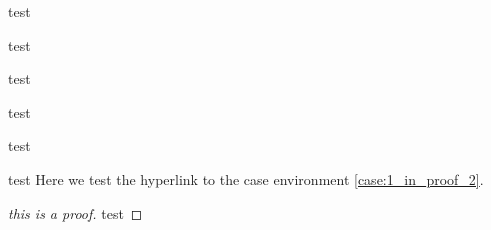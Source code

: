     \begin{corollary}
        test 
    \end{corollary}
    \begin{question}
        test
    \end{question}
    \begin{conjecture}
        test
    \end{conjecture}

    \begin{example}
        test 
    \end{example}
    \begin{exercise}
        test
    \end{exercise}
    \begin{remark}
        test
        Here we test the hyperlink to the case environment \cref{case:1_in_proof_2}.
    \end{remark}
    \begin{proof}[this is a proof]
        test
    \end{proof}


